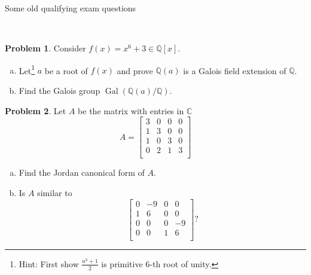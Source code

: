 \documentclass[11pt]{article}
\title{}
\date{\vspace{-0.5in}}
\DeclareMathOperator{\Gal}{Gal}
\newcommand{\C}{\mathbb{C}}
\newcommand{\Q}{\mathbb{Q}}
\theoremstyle{definition}
\newtheorem{problem}{Problem}
\begin{document}
\thispagestyle{fancy}
\pagestyle{fancy}

\vspace{3em}

\begin{center}
	{\LARGE Some old qualifying exam questions\\}
\end{center}

\



\begin{problem} Consider $f(x) = x^6 + 3 \in \Q[x]$.

    \begin{enumerate}[(a)]
    \item Let\footnote{Hint: First show $\frac{a^3+1}2$ 
is primitive 6-th root of unity.} $a$ be a root of $f(x)$ and prove $\Q(a)$ is a Galois field extension of $\Q$. 

\item Find the Galois group $\Gal(\Q(a)/\Q)$.

     \end{enumerate}
     \end{problem}
     
     
     \begin{problem} Let $A$ be the matrix with entries in $\C$
     $$
     A  = \begin{bmatrix}
       3 & 0 & 0&  0 \\
       1 & 3 &0 &0\\
       1 &0 &3 &0 \\
       0&2&1&3\\
     \end{bmatrix}
         $$
         \begin{enumerate}[(a)]
         \item Find the Jordan canonical form of $A$.
         \item Is $A$ similar to
           $$
           \begin{bmatrix}
           0& -9& 0& 0 \\
           1& 6& 0& 0 \\
           0& 0& 0& -9 \\
           0&0&1&6 \\
         \end{bmatrix}?
         $$

     
       \end{enumerate}
       \end{problem}
       
\end{document}
